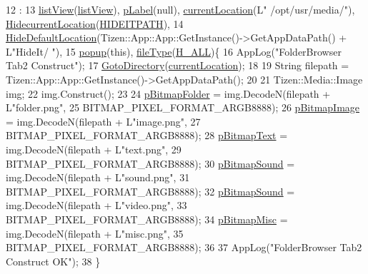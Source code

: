\begin{DoxyCode}
12                                                    :
13         \hyperlink{class_folder_browser_aee2bb8ad9f494b0ada8ee359a2e34555}{listView}(\hyperlink{class_folder_browser_aee2bb8ad9f494b0ada8ee359a2e34555}{listView}), \hyperlink{class_folder_browser_ac56283b5a6a8dc00438d7bf4625c82bd}{pLabel}(null), \hyperlink{class_folder_browser_a1f7bc249da2f28c6a03759a983eacf75}{currentLocation}(L\textcolor{stringliteral}{"
      /opt/usr/media/"}), \hyperlink{class_folder_browser_acfb2670184ff88e3b06e2562d02983ce}{HidecurrentLocation}(\hyperlink{_folder_browser_8h_a310e56072401d167ec479a192944cc5c}{HIDEITPATH}),
14         \hyperlink{class_folder_browser_a7573f676c492fcd3a5d63319cd5eb325}{HideDefaultLocation}(Tizen::App::App::GetInstance()->GetAppDataPath() + L\textcolor{stringliteral}{"HideIt/
      "}),
15         \hyperlink{class_folder_browser_a9715e8af0c63d75be7c1d65f3c4b47f8}{popup}(\textcolor{keyword}{this}), \hyperlink{class_folder_browser_ab240fcb3674e6887f601fd23c25477f3}{fileType}(\hyperlink{_folder_browser_8h_af547d73b85f475c4abfafdb76bf0c301aad30772cd86a5fa22262bf9c16c2eb42}{H\_ALL})\{
16     AppLog(\textcolor{stringliteral}{"FolderBrowser Tab2 Construct"});
17     \hyperlink{class_folder_browser_a00c58611b113347764a8ca6bb7b14eca}{GotoDirectory}(\hyperlink{class_folder_browser_a1f7bc249da2f28c6a03759a983eacf75}{currentLocation});
18 
19     String filepath = Tizen::App::App::GetInstance()->GetAppDataPath();
20 
21     Tizen::Media::Image img;
22     img.Construct();
23 
24     \hyperlink{class_folder_browser_a59c025c6956a8a9ef74395d12261a36e}{pBitmapFolder} = img.DecodeN(filepath + L\textcolor{stringliteral}{"folder.png"},
25             BITMAP\_PIXEL\_FORMAT\_ARGB8888);
26     \hyperlink{class_folder_browser_a4d40caed1664eca59bbf9e3da1cde15c}{pBitmapImage} = img.DecodeN(filepath + L\textcolor{stringliteral}{"image.png"},
27             BITMAP\_PIXEL\_FORMAT\_ARGB8888);
28     \hyperlink{class_folder_browser_ac204936172a6e66bcf444e2cd9ff7ec4}{pBitmapText} = img.DecodeN(filepath + L\textcolor{stringliteral}{"text.png"},
29             BITMAP\_PIXEL\_FORMAT\_ARGB8888);
30     \hyperlink{class_folder_browser_a375413fdf422f14ee9ea6ab055ffaebd}{pBitmapSound} = img.DecodeN(filepath + L\textcolor{stringliteral}{"sound.png"},
31             BITMAP\_PIXEL\_FORMAT\_ARGB8888);
32     \hyperlink{class_folder_browser_a375413fdf422f14ee9ea6ab055ffaebd}{pBitmapSound} = img.DecodeN(filepath + L\textcolor{stringliteral}{"video.png"},
33             BITMAP\_PIXEL\_FORMAT\_ARGB8888);
34     \hyperlink{class_folder_browser_aa92204857b0b7a8d056ab74f5d9bc962}{pBitmapMisc} = img.DecodeN(filepath + L\textcolor{stringliteral}{"misc.png"},
35             BITMAP\_PIXEL\_FORMAT\_ARGB8888);
36 
37     AppLog(\textcolor{stringliteral}{"FolderBrowser Tab2 Construct OK"});
38 \}
\end{DoxyCode}


